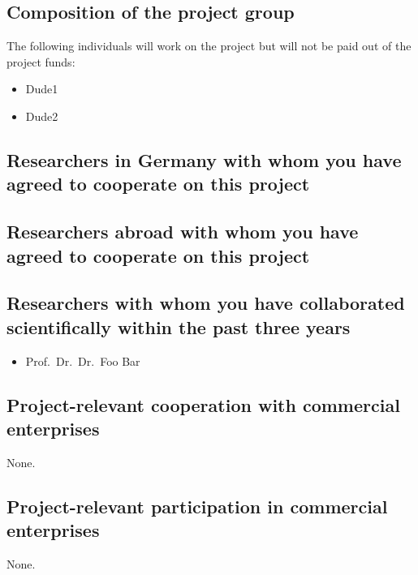 \documentclass{scrartcl}
\begin{document}
\subsection{Composition of the project group}

The following individuals will work on the project but will not be paid out of the project funds:

\begin{itemize}
\item Dude1
\item Dude2
\end{itemize}

\subsection{Researchers in Germany with whom you have agreed to cooperate on this project}

\subsection{Researchers abroad with whom you have agreed to cooperate on this project}

\subsection{Researchers with whom you have collaborated scientifically within the past three years}
\begin{itemize}
  \item Prof.\ Dr.\ Dr.\ Foo Bar
\end{itemize}

\subsection{Project-relevant cooperation with commercial enterprises}
None.

\subsection{Project-relevant participation in commercial enterprises}
None.
\end{document}
